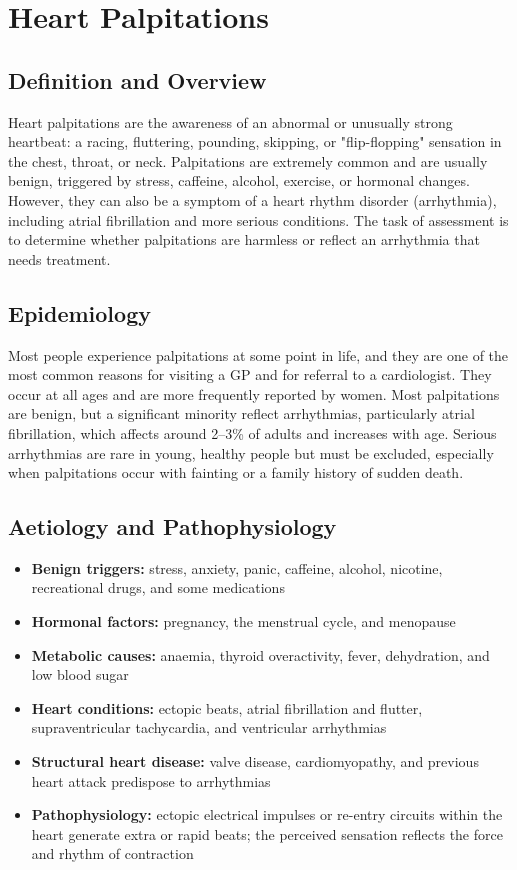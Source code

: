 \chapter{Heart Palpitations}

\section*{Definition and Overview}
Heart palpitations are the awareness of an abnormal or unusually strong heartbeat: a racing, fluttering, pounding, skipping, or "flip-flopping" sensation in the chest, throat, or neck. Palpitations are extremely common and are usually benign, triggered by stress, caffeine, alcohol, exercise, or hormonal changes. However, they can also be a symptom of a heart rhythm disorder (arrhythmia), including atrial fibrillation and more serious conditions. The task of assessment is to determine whether palpitations are harmless or reflect an arrhythmia that needs treatment.

\section*{Epidemiology}
Most people experience palpitations at some point in life, and they are one of the most common reasons for visiting a GP and for referral to a cardiologist. They occur at all ages and are more frequently reported by women. Most palpitations are benign, but a significant minority reflect arrhythmias, particularly atrial fibrillation, which affects around 2--3\% of adults and increases with age. Serious arrhythmias are rare in young, healthy people but must be excluded, especially when palpitations occur with fainting or a family history of sudden death.

\section*{Aetiology and Pathophysiology}
\begin{itemize}
    \item \textbf{Benign triggers:} stress, anxiety, panic, caffeine, alcohol, nicotine, recreational drugs, and some medications
    \item \textbf{Hormonal factors:} pregnancy, the menstrual cycle, and menopause
    \item \textbf{Metabolic causes:} anaemia, thyroid overactivity, fever, dehydration, and low blood sugar
    \item \textbf{Heart conditions:} ectopic beats, atrial fibrillation and flutter, supraventricular tachycardia, and ventricular arrhythmias
    \item \textbf{Structural heart disease:} valve disease, cardiomyopathy, and previous heart attack predispose to arrhythmias
    \item \textbf{Pathophysiology:} ectopic electrical impulses or re-entry circuits within the heart generate extra or rapid beats; the perceived sensation reflects the force and rhythm of contraction
\end{itemize}

